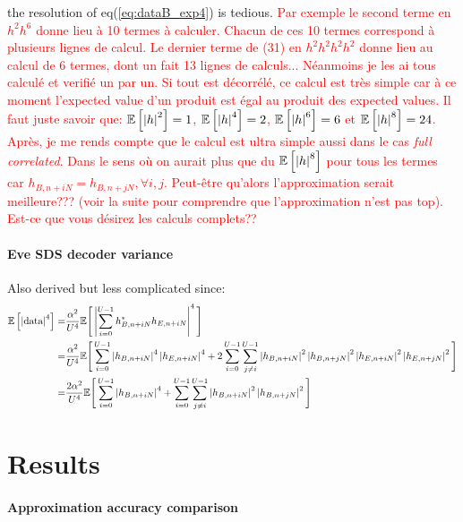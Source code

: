\documentclass[12pt]{article}
\begin{document}
the resolution of eq(\ref{eq:dataB_exp4}) is tedious. \textcolor{red}{Par exemple le second terme en $h^2 h^6$ donne lieu à 10 termes à calculer. Chacun de ces 10 termes correspond à plusieurs lignes de calcul. Le dernier terme de (31) en $h^2h^2h^2h^2$ donne lieu au calcul de 6 termes, dont un fait 13 lignes de calculs... Néanmoins je les ai tous calculé et verifié un par un. Si tout est décorrélé, ce calcul est très simple car à ce moment l'expected value d'un produit est égal au produit des expected values. Il faut juste savoir que: $\mathbb{E} \left[\left|h\right|^2\right] = 1$, $\mathbb{E} \left[\left|h\right|^4\right] = 2$, $\mathbb{E} \left[\left|h\right|^6\right] = 6$ et $\mathbb{E} \left[\left|h\right|^8\right] = 24$. Après, je me rends compte que le calcul est ultra simple aussi dans le cas \textit{full correlated}. Dans le sens où on aurait plus que du $\mathbb{E} \left[\left|h\right|^8\right]$ pour tous les termes car $h_{B,n+iN} = h_{B,n+jN}, \forall i,j$. Peut-être qu'alors l'approximation serait meilleure??? (voir la suite pour comprendre que l'approximation n'est pas top). Est-ce que vous désirez les calculs complets??}

\paragraph*{Eve SDS decoder variance}
Also derived but less complicated since:
\begin{equation}
\begin{split}
\mathbb{E} \left[\left|\text{data}\right|^4\right] = &\frac{\alpha^2}{U^4} \mathbb{E}\Bigg[ \left|\sum_{i=0}^{U-1}h^*_{B,n+iN} h_{E,n+iN}\right|^4\Bigg] \\
= &\frac{\alpha^2}{U^4} \mathbb{E}\Bigg[ \sum_{i=0}^{U-1} \left|h_{B,n+iN}\right|^4   \left|h_{E,n+iN}\right|^4  +2 \sum_{i=0}^{U-1} \sum_{j \neq i}^{U-1} \left|h_{B,n+iN}\right|^2\left|h_{B,n+jN}\right|^2\left|h_{E,n+iN}\right|^2 \left|h_{E,n+jN}\right|^2 \Bigg] \\
=& \frac{2\alpha^2}{U^4}   \mathbb{E}\Bigg[\sum_{i=0}^{U-1} \left|h_{B,n+iN}\right|^4  + \sum_{i=0}^{U-1} \sum_{j \neq i}^{U-1} \left|h_{B,n+iN}\right|^2\left|h_{B,n+jN}\right|^2  \Bigg] 
\end{split}
\label{eq:dataE_exp4}
\end{equation}



\section{Results}
\paragraph*{Approximation accuracy comparison}
\end{document}
